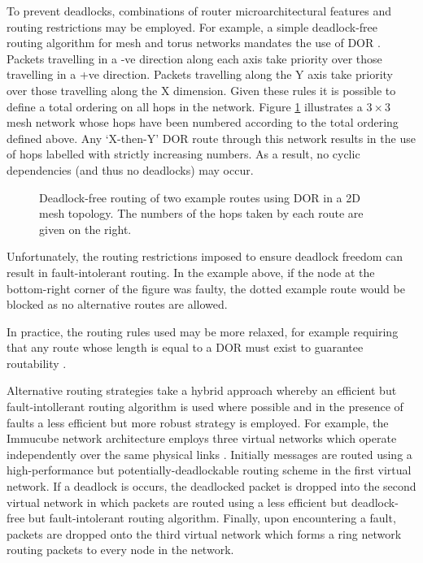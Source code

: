 			To prevent deadlocks, combinations of router microarchitectural features
			and routing restrictions may be employed. For example, a simple
			deadlock-free routing algorithm for mesh and torus networks mandates the
			use of DOR \cite{dally93}. Packets travelling in a -ve direction along
			each axis take priority over those travelling in a +ve direction. Packets
			travelling along the Y axis take priority over those travelling along the
			X dimension. Given these rules it is possible to define a total ordering
			on all hops in the network. Figure \ref{fig:deadlock-free-dor}
			illustrates a $3\times3$ mesh network whose hops have been numbered
			according to the total ordering defined above.  Any `X-then-Y' DOR route
			through this network results in the use of hops labelled with strictly
			increasing numbers. As a result, no cyclic dependencies (and thus no
			deadlocks) may occur.
			
			\begin{figure}
				\center
			
				\caption{Deadlock-free routing of two example routes using DOR in a 2D
				mesh topology. The numbers of the hops taken by each route are given on
				the right.}
				\label{fig:deadlock-free-dor}
			\end{figure}
			
			Unfortunately, the routing restrictions imposed to ensure deadlock
			freedom can result in fault-intolerant routing. In the example above, if
			the node at the bottom-right corner of the figure was faulty, the dotted
			example route would be blocked as no alternative routes are allowed.
			
			In practice, the routing rules used may be more relaxed, for example
			requiring that any route whose length is equal to a DOR must exist to
			guarantee routability \cite{rodrigo09}.
			
			Alternative routing strategies take a hybrid approach whereby an
			efficient but fault-intollerant routing algorithm is used where possible
			and in the presence of faults a less efficient but more robust strategy
			is employed. For example, the Immucube network architecture employs three
			virtual networks which operate independently over the same physical links
			\cite{puente07}. Initially messages are routed using a high-performance
			but potentially-deadlockable routing scheme in the first virtual network.
			If a deadlock is occurs, the deadlocked packet is dropped into the second
			virtual network in which packets are routed using a less efficient but
			deadlock-free but fault-intolerant routing algorithm. Finally, upon
			encountering a fault, packets are dropped onto the third virtual network
			which forms a ring network routing packets to every node in the network.
			
